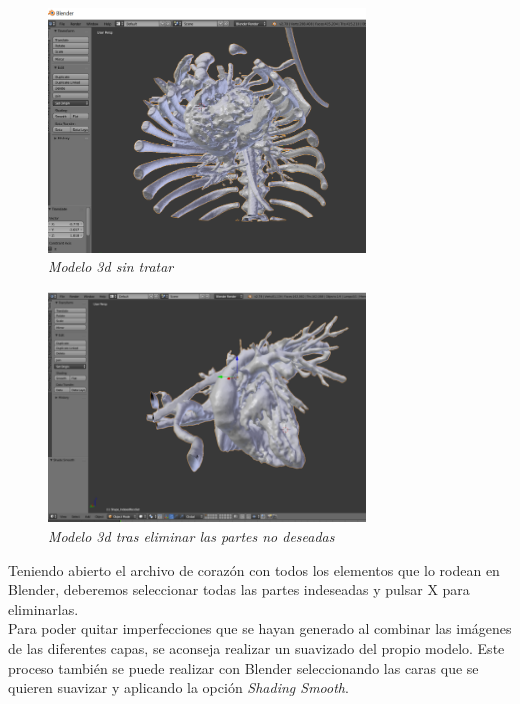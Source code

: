 \documentclass[a4paper,12pt]{article}
\begin{document}
	\begin{figure}[!ht]
	\begin{center}
	  \includegraphics[width=0.75\textwidth]{Figuras/mod_01.png}
	  \caption{\emph{Modelo 3d sin tratar}}
	\end{center}
	\label{fig:mod_01}
	\end{figure}

	\begin{figure}[!ht]
	\begin{center}
	  \includegraphics[width=0.75\textwidth]{Figuras/mod_02.png}
	  \caption{\emph{Modelo 3d tras eliminar las partes no deseadas}}
	\end{center}
	\label{fig:mod_02}
	\end{figure}


Teniendo abierto el archivo de corazón con todos los elementos que lo rodean en Blender, deberemos seleccionar todas las partes indeseadas y pulsar X para eliminarlas.\\

Para poder quitar imperfecciones que se hayan generado al combinar las imágenes de las diferentes capas, se aconseja realizar un suavizado del propio modelo. Este proceso también se puede realizar con Blender seleccionando las caras que se quieren suavizar y aplicando la opción \emph{Shading Smooth}.\\
\end{document}
